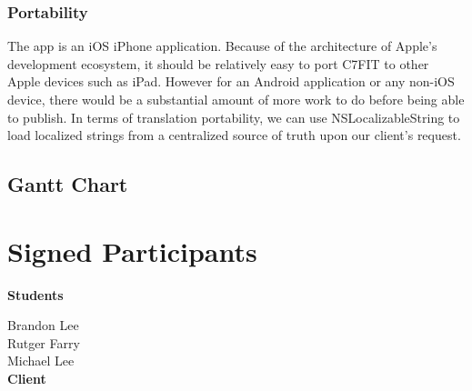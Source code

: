 \documentclass[letterpaper,10pt,titlepage]{article}
\begin{document}
\subsubsection{Portability}

The app is an iOS iPhone application. Because of the architecture of Apple’s development ecosystem, it should be relatively easy to port C7FIT to other Apple devices such as iPad. However for an Android application or any non-iOS device, there would be a substantial amount of more work to do before being able to publish. In terms of translation portability, we can use NSLocalizableString to load localized strings from a centralized source of truth upon our client's request.\\

\subsection{Gantt Chart}

\noindent{}

\newpage

\section{Signed Participants}

\textbf{Students}

Brandon Lee\\
Rutger Farry\\
Michael Lee\\

\textbf{Client}
\end{document}
